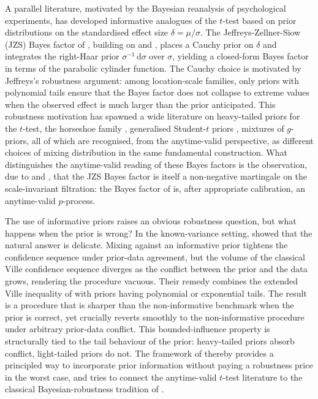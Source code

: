 \documentclass{article}%
\newcommand{\dd}{\,\mathrm{d}}
\newcommand{\1}{\mathbf{1}}
\begin{document}
A parallel literature, motivated by the Bayesian reanalysis of
psychological experiments, has developed informative analogues of the
\(t\)-test based on prior distributions on the standardised effect size
\(\delta=\mu/\sigma\). The Jeffreys-Zellner-Siow (JZS) Bayes factor of
\cite{Rouder2009}, building on \cite{jeffreys1998theory} and
\cite{zellner1980posterior}, places a Cauchy prior on \(\delta\) and
integrates the right-Haar prior \(\sigma^{-1}\dd\sigma\) over \(\sigma\),
yielding a closed-form Bayes factor in terms of the parabolic cylinder
function. The Cauchy choice is motivated by Jeffreys's robustness
argument: among location-scale families, only priors with polynomial
tails ensure that the Bayes factor does not collapse to extreme values
when the observed effect is much larger than the prior anticipated.
This robustness motivation has spawned a wide literature on
heavy-tailed priors for the \(t\)-test, the horseshoe family
\cite{Carvalho2010}, generalised Student-\(t\) priors \cite{gronau2020informed}, mixtures of \(g\)-priors, all of which are recognised, from the anytime-valid perspective, as different choices of mixing distribution in the same fundamental construction. What distinguishes the anytime-valid reading of these Bayes factors is the observation, due to \cite{PerezOrtiz2024} and \cite{Wang2025}, that the JZS Bayes factor is itself a non-negative martingale on the scale-invariant filtration: the Bayes factor of \cite{Rouder2009} is, after appropriate calibration, an anytime-valid \(p\)-process.

The use of informative priors raises an obvious robustness question, but
what happens when the prior is wrong? In the known-variance setting,
\cite{Cortinovis2025} showed that the natural answer is delicate. Mixing
against an informative prior tightens the confidence sequence under
prior-data agreement, but the volume of the classical Ville confidence
sequence diverges as the conflict between the prior and the data
grows, rendering the procedure vacuous. Their remedy combines the
extended Ville inequality of \cite{wang2025extended} with priors having
polynomial or exponential tails. The result is a procedure that is
sharper than the non-informative benchmark when the prior is correct,
yet crucially reverts smoothly to the non-informative procedure
under arbitrary prior-data conflict. This bounded-influence property is structurally tied to the tail behaviour of the prior: heavy-tailed priors absorb conflict, light-tailed priors do not. The
framework of \cite{Cortinovis2025} thereby provides a principled way to
incorporate prior information without paying a robustness price in the
worst case, and tries to connect the anytime-valid \(t\)-test literature to
the classical Bayesian-robustness tradition of \cite{Dawid1973, PericchiSmith1992, PericchiSanso1995, Berger1980}.
\end{document}
